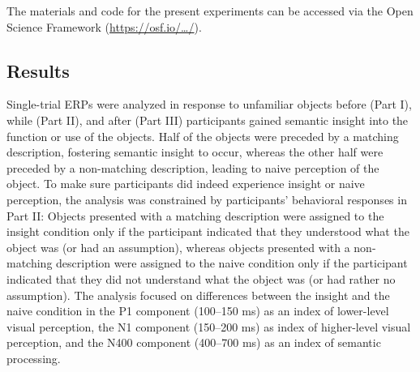 \documentclass[
  english,
  man,11pt,floatsintext]{apa7}
\begin{document}
The materials and code for the present experiments can be accessed via the Open Science Framework (\href{https://osf.io/myprojects/}{https://osf.io/\ldots/}).

\hypertarget{results}{%
\subsection{Results}\label{results}}

Single-trial ERPs were analyzed in response to unfamiliar objects before (Part I), while (Part II), and after (Part III) participants gained semantic insight into the function or use of the objects. Half of the objects were preceded by a matching description, fostering semantic insight to occur, whereas the other half were preceded by a non-matching description, leading to naive perception of the object. To make sure participants did indeed experience insight or naive perception, the analysis was constrained by participants' behavioral responses in Part II: Objects presented with a matching description were assigned to the insight condition only if the participant indicated that they understood what the object was (or had an assumption), whereas objects presented with a non-matching description were assigned to the naive condition only if the participant indicated that they did not understand what the object was (or had rather no assumption). The analysis focused on differences between the insight and the naive condition in the P1 component (100--150 ms) as an index of lower-level visual perception, the N1 component (150--200 ms) as index of higher-level visual perception, and the N400 component (400--700 ms) as an index of semantic processing.
\end{document}
